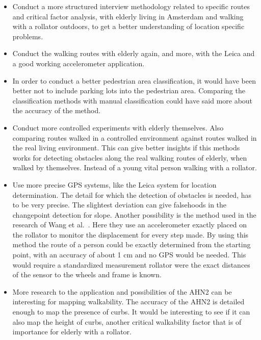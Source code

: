 \begin{itemize}
\item Conduct a more structured interview methodology related to specific routes and critical factor analysis, with elderly living in Amsterdam and walking with a rollator outdoors, to get a better understanding of location specific problems. 

\item Conduct the walking routes with elderly again, and more, with the Leica and a good working accelerometer application. 

\item In order to conduct a better pedestrian area classification, it would have been better not to include parking lots into the pedestrian area. Comparing the classification methods with manual classification could have said more about the accuracy of the method. 

\item Conduct more controlled experiments with elderly themselves. Also comparing routes walked in a controlled environment against routes walked in the real living environment. This can give better insights if this methods works for detecting obstacles along the real walking routes of elderly, when walked by themselves. Instead of a young vital person walking with a rollator. 

\item Use more precise GPS systems, like the Leica system for location determination. The detail for which the detection of obstacles is needed, has to be very precise. The slightest deviation can give falsehoods in the changepoint detection for slope. Another possibility is the method used in the research of Wang et al.~\cite{Wang2015}. Here they use an accelerometer exactly placed on the rollator to monitor the displacement for every step made. By using this method the route of a person could be exactly determined from the starting point, with an accuracy of about 1 cm and no GPS would be needed. This would require a standardized measurement rollator were the exact distances of the sensor to the wheels and frame is known.

\item More research to the application and possibilities of the AHN2 can be interesting for mapping walkability. The accuracy of the AHN2 is detailed enough to map the presence of curbs. It would be interesting to see if it can also map the height of curbs, another critical walkability factor that is of importance for elderly with a rollator.

\end{itemize}

